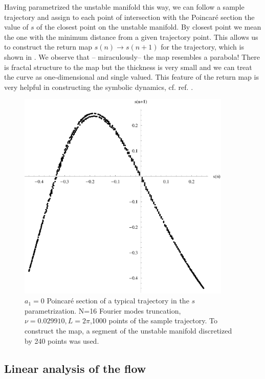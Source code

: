 \documentclass[pre,preprint,groupedaddress,showpacs,showkeys]{revtex4}
\begin{document}
  Having parametrized the unstable manifold this way, we can follow a
  sample trajectory and assign to each point of intersection with the
  Poincar\'e section the value of $s$ of the closest point on the
  unstable manifold. %
  By closest point we mean the one with the minimum distance
  from a given trajectory point.
  This allows us to construct the return map
  $s(n)\rightarrow s(n+1)$ for the trajectory, which is shown in
  . We observe that -- miraculously-- the map
  resembles a parabola! There is fractal structure to the map but the
  thickness is very small and we can treat the curve as
  one-dimensional and single valued. This feature of the return map
  is very helpful in constructing the symbolic dynamics, cf. ref. \cite{Christiansen:97}.

  \begin{figure}[h!]
      \includegraphics[width=4in]{figs/sPoincarePlot.eps}
      \caption{ $a_1=0$ Poincar\'e section of a typical trajectory in
        the $s$ parametrization. N=16 Fourier modes truncation,
        $\nu=0.029910, L=2\pi$,1000 points of the sample trajectory.
        To construct the map, a segment of the
        unstable manifold discretized by 240 points was used.
      }
  \label{fig:sPoincare}
  \end{figure}



 \subsection{Linear analysis of the flow}
\end{document}
